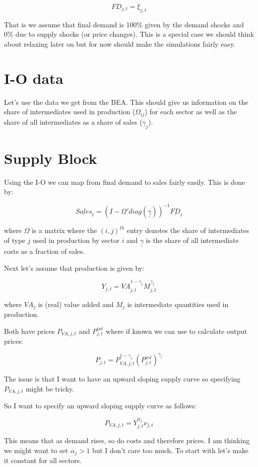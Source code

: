 \documentclass[12pt,english]{article}
\begin{document}
$$
	FD_{j,t} = \xi_{j,t}
$$

That is we assume that final demand is 100\% given by the demand shocks and 0\% due to supply shocks (or price changes). This is a special case we should think about relaxing later on but for now should make the simulations fairly easy.

\section{I-O data}

Let's use the data we get from the BEA. This should give us information on the share of intermediates used in production ($\Omega_{ij}$) for each sector as well as the share of all intermediates as a share of sales ($\gamma_j$).

\section{Supply Block}

Using the I-O we can map from final demand to sales fairly easily. This is done by:

$$
	\underline{Sales}_t = (I-\Omega' diag(\underline{\gamma}))^{-1}\underline{FD}_{t}
$$

where $\Omega$ is a matrix where the $(i,j)^{th}$ entry denotes the share of intermediates of type $j$ used in production by sector $i$ and $\underline{\gamma}$ is the share of all intermediate costs as a fraction of sales.

Next let's assume that production is given by:

$$
	Y_{j,t} = VA_{j,t}^{1-\gamma_j}M_{j,t}^{\gamma_{j}}
$$

where $VA_j$ is (real) value added and $M_j$ is intermediate quantities used in production.

Both have prices $P_{VA,j,t}$ and $P_{j,t}^{int}$ where if known we can use to calculate output prices:

$$
P_{j,t} = P_{VA,j,t}^{1-\gamma_j}(P_{j,t}^{int})^{\gamma_j}
$$

The issue is that I want to have an upward sloping supply curve so specifying $P_{VA,j,t}$ might be tricky.

So I want to specify an upward sloping supply curve as follows:

$$
	P_{VA,j,t} = Y_{j,t}^{\alpha_j}\nu_{j,t} 
$$

This means that as demand rises, so do costs and therefore prices. I am thinking we might want to set $\alpha_j>1$ but I don't care too much. To start with let's make it constant for all sectors.
\end{document}
